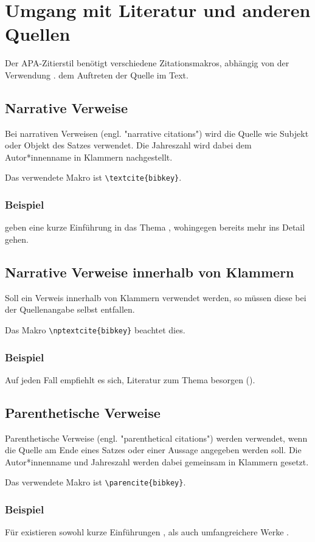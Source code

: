 \chapter[Umgang mit Literatur]{Umgang mit Literatur und anderen Quellen}
\label{cha:Literatur}

Der APA-Zitierstil benötigt verschiedene Zitationsmakros, abhängig von der Verwendung \bzw. dem Auftreten der Quelle im Text.

\section{Narrative Verweise}

Bei narrativen Verweisen (engl. "narrative citations") wird die Quelle wie Subjekt oder Objekt des Satzes verwendet. Die Jahreszahl wird dabei dem Autor*innenname in Klammern nachgestellt.

Das verwendete Makro ist \verb|\textcite{bibkey}|.

\subsection{Beispiel}

\textcite{Daniel2018} geben eine kurze Einführung in das Thema \latex, wohingegen \textcite{Oetiker2018, Kopka2003} bereits mehr ins Detail gehen.

\section{Narrative Verweise innerhalb von Klammern}

Soll ein Verweis innerhalb von Klammern verwendet werden, so müssen diese bei der Quellenangabe selbst entfallen.

Das Makro \verb|\nptextcite{bibkey}| beachtet dies.

\subsection{Beispiel}

Auf jeden Fall empfiehlt es sich, Literatur zum Thema \latex besorgen (\zB {}).

\section{Parenthetische Verweise}

Parenthetische Verweise (engl. "parenthetical citations") werden verwendet, wenn die Quelle am Ende eines Satzes oder einer Aussage angegeben werden soll. Die Autor*innenname und Jahreszahl werden dabei gemeinsam in Klammern gesetzt.

Das verwendete Makro ist \verb|\parencite{bibkey}|.

\subsection{Beispiel}

Für \latex existieren sowohl kurze Einführungen \parencite{Daniel2018}, als auch umfangreichere Werke \parencite{Oetiker2018, Kopka2003}.

